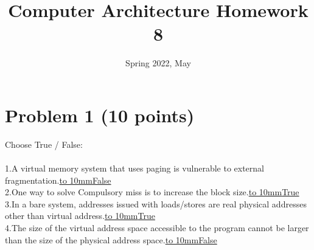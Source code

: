 \documentclass[answers]{exam}
\title{Computer Architecture Homework 8}
\date{Spring 2022, May}
\begin{document}
\maketitle

\section*{Problem 1 (10 points) }
Choose True / False:\\
\\1.A virtual memory system that uses paging is vulnerable to external fragmentation.\underline{\hbox to 10mm{False}}
\\2.One way to solve Compulsory miss is to increase the block size.\underline{\hbox to 10mm{True}}
\\3.In a bare system, addresses issued with loads/stores are real physical addresses other than virtual address.\underline{\hbox to 10mm{True}}
\\4.The size of the virtual address space accessible to the program cannot be larger than the size of the physical address space.\underline{\hbox to 10mm{False}}\\
\end{document}
